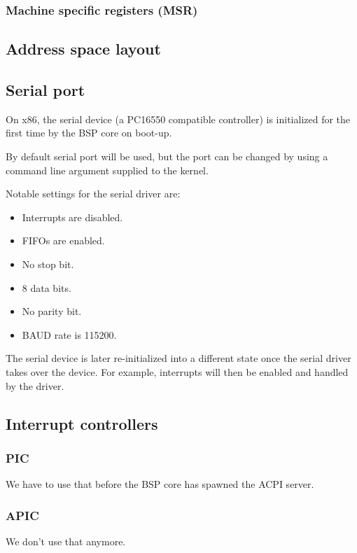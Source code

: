 \documentclass[a4paper,11pt,twoside]{report}
\begin{document}
{{\subsubsection{Machine specific registers (MSR)}

\subsection{Address space layout}

\subsection{Serial port}
On x86, the serial device (a PC16550 compatible controller) is initialized for the first time by the BSP core on boot-up.

By default serial port  will be used, but the port can be changed by
using a command line argument supplied to the kernel.

Notable settings for the serial driver are:
\begin{itemize}
    \item Interrupts are disabled.
    \item FIFOs are enabled.
    \item No stop bit.
    \item 8 data bits.
    \item No parity bit.
    \item BAUD rate is 115200.
\end{itemize}

The serial device is later re-initialized into a different state once the
serial driver takes over the device. For example, interrupts will then be
enabled and handled by the driver.


\subsection{Interrupt controllers}

\subsubsection{PIC}
We have to use that before the BSP core has spawned the ACPI server.

\subsubsection{APIC}
We don't use that anymore.

}}
\end{document}
